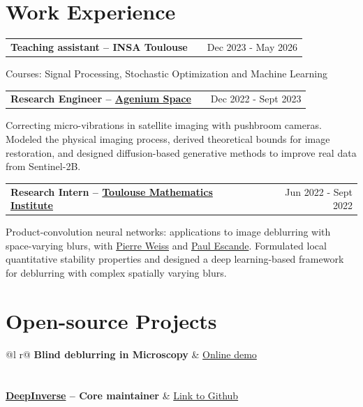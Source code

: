 \documentclass[a4paper,11pt]{article}
\makeatletter
\newenvironment{jobshort}[2]
    {
    \begin{tabularx}{\linewidth}{@{}l X r@{}}
    \textbf{#1} & \hfill &  #2 \\[3.75pt]
    \end{tabularx}
    }
    {
    }
\makeatother
\begin{document}
\section{Work Experience}
\begin{jobshort}{Teaching assistant -- INSA Toulouse}{Dec 2023 - May 2026}
Courses: Signal Processing, Stochastic Optimization and Machine Learning
\end{jobshort}

\begin{jobshort}{Research Engineer -- \href{https://agenium-space.com/}{Agenium Space}}{Dec 2022 - Sept 2023}
Correcting micro-vibrations in satellite imaging with pushbroom cameras.
Modeled the physical imaging process, derived theoretical bounds for image restoration, and designed diffusion-based generative methods to improve real data from Sentinel-2B.
\end{jobshort}

\begin{jobshort}{Research Intern -- \href{https://www.math.univ-toulouse.fr/fr/}{Toulouse Mathematics Institute}}{Jun 2022 - Sept 2022}
Product-convolution neural networks: applications to image deblurring with space-varying blurs, with \href{https://pierre-weiss.github.io/}{Pierre Weiss} and \href{https://pescande.perso.math.cnrs.fr/}{Paul Escande}.
Formulated local quantitative stability properties and designed a deep learning-based framework for deblurring with complex spatially varying blurs.
\end{jobshort}


\section{Open-source Projects}
\begin{tabularx}{\linewidth}{ @{}l r@{} }
\textbf{Blind deblurring in Microscopy} & \hfill \href{https://deepblur.mambo-utoulouse.fr/}{Online demo}
\\[2pt]
\\ \\
\textbf{\href{https://deepinv.github.io/deepinv/}{DeepInverse} -- Core maintainer} & \hfill \href{https://github.com/deepinv/deepinv}{Link to Github} 
\\[2pt]
  \\
\end{tabularx}
\end{document}
